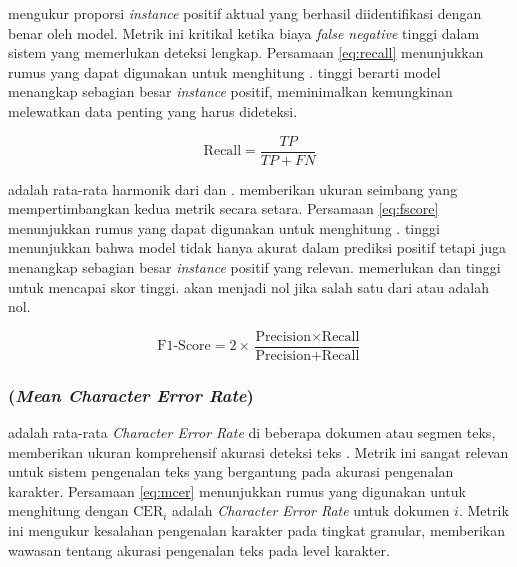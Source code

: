 \recallfl{} mengukur proporsi \emph{instance} positif aktual yang berhasil diidentifikasi dengan benar oleh model. Metrik ini kritikal ketika biaya \emph{false negative} tinggi dalam sistem yang memerlukan deteksi lengkap. Persamaan \eqref{eq:recall} menunjukkan rumus yang dapat digunakan untuk menghitung \recall \parencite{jayaswal2020evalmetrics}.\recallfl{} tinggi berarti model menangkap sebagian besar \emph{instance} positif, meminimalkan kemungkinan melewatkan data penting yang harus dideteksi.

\begin{equation}
    \label{eq:recall}
\text{Recall} = \frac{TP}{TP + FN}
\end{equation}

\fscore{} adalah rata-rata harmonik dari \precision{} dan \recall{}. \fscore{} memberikan ukuran seimbang yang mempertimbangkan kedua metrik secara setara. Persamaan \eqref{eq:fscore} menunjukkan rumus yang dapat digunakan untuk menghitung \fscore \parencite{jayaswal2020evalmetrics}. \fscore{} tinggi menunjukkan bahwa model tidak hanya akurat dalam prediksi positif tetapi juga menangkap sebagian besar \emph{instance} positif yang relevan. \fscore{} memerlukan \precision{} dan \recall{} tinggi untuk mencapai skor tinggi. \fscore{} akan menjadi nol jika salah satu dari \precision atau \recall adalah nol.

\begin{equation}
    \label{eq:fscore}
\text{F1-Score} = 2 \times \frac{\text{Precision} \times \text{Recall}}{\text{Precision} + \text{Recall}}
\end{equation}

% 

\subsubsection{\mcer{} (\emph{Mean Character Error Rate})}

\mcer{} adalah rata-rata \emph{Character Error Rate} di beberapa dokumen atau segmen teks, memberikan ukuran komprehensif akurasi deteksi teks \parencite{holley2009ocr}. Metrik ini sangat relevan untuk sistem pengenalan teks yang bergantung pada akurasi pengenalan karakter. Persamaan \eqref{eq:mcer} menunjukkan rumus yang digunakan untuk menghitung \mcer dengan $\text{CER}_i$ adalah \emph{Character Error Rate} untuk dokumen $i$. Metrik ini mengukur kesalahan pengenalan karakter pada tingkat granular, memberikan wawasan tentang akurasi pengenalan teks pada level karakter.

